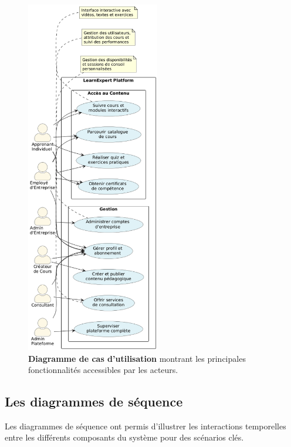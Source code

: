 \begin{figure}[H]
  \centering
  \includegraphics[width=0.52\textwidth,keepaspectratio]{images/usecase_diagram.png}
  \caption{\textbf{Diagramme de cas d'utilisation} montrant les principales fonctionnalités accessibles par les acteurs.}
  \label{fig:usecase_diagram}
\end{figure}

\subsection{Les diagrammes de séquence}
Les diagrammes de séquence ont permis d'illustrer les interactions temporelles entre les différents composants du système pour des scénarios clés.

